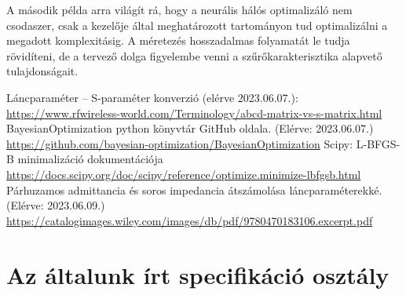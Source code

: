         
        A második példa arra világít rá, hogy a neurális hálós optimalizáló nem csodaszer, csak a kezelője által meghatározott tartományon tud optimalizálni a megadott komplexitásig. A méretezés hosszadalmas folyamatát le tudja rövidíteni, de a tervező dolga figyelembe venni a szűrőkarakterisztika alapvető tulajdonságait.

\clearpage
\begin{thebibliography}{9}
     Láncparaméter -- S-paraméter konverzió (elérve 2023.06.07.): \url{https://www.rfwireless-world.com/Terminology/abcd-matrix-vs-s-matrix.html}
     BayesianOptimization python könyvtár GitHub oldala. (Elérve: 2023.06.07.) \url{https://github.com/bayesian-optimization/BayesianOptimization}
     Scipy: L-BFGS-B minimalizáció dokumentációja \url{https://docs.scipy.org/doc/scipy/reference/optimize.minimize-lbfgsb.html}
	 Párhuzamos admittancia és soros impedancia átszámolása láncparaméterekké. (Elérve: 2023.06.09.) \url{https://catalogimages.wiley.com/images/db/pdf/9780470183106.excerpt.pdf}
\end{thebibliography}

\clearpage
\appendix
\section{Az általunk írt specifikáció osztály}
	

